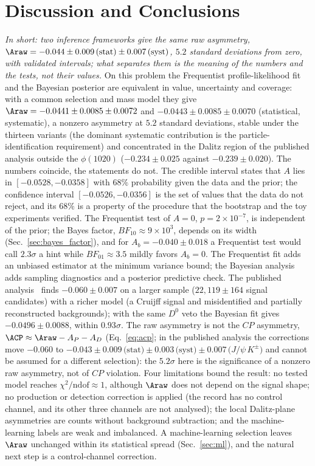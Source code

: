 \section{Discussion and Conclusions}
\label{sec:conclusions}
\label{app:conclusions}
\emph{In short: two inference frameworks give the same raw asymmetry, $\Araw=-0.044\pm0.009\,(\text{stat})\pm0.007\,(\text{syst})$, $5.2$ standard deviations from zero, with validated intervals; what separates them is the meaning of the numbers and the tests, not their values.}
On this problem the Frequentist profile-likelihood fit and the Bayesian posterior are equivalent in value, uncertainty and coverage: with a common selection and mass model they give $\Araw=-0.0441\pm0.0085\pm0.0072$ and $-0.0443\pm0.0085\pm0.0070$ (statistical, systematic), a nonzero asymmetry at $5.2$ standard deviations, stable under the thirteen variants (the dominant systematic contribution is the particle-identification requirement) and concentrated in the Dalitz region of the published analysis outside the $\phi(1020)$ ($-0.234\pm0.025$ against $-0.239\pm0.020$).
The numbers coincide, the statements do not. The credible interval states that $A$ lies in $[-0.0528,-0.0358]$ with $68\%$ probability given the data and the prior; the confidence interval $[-0.0526,-0.0356]$ is the set of values that the data do not reject, and its $68\%$ is a property of the procedure that the bootstrap and the toy experiments verified. The Frequentist test of $A=0$, $p=2\times10^{-7}$, is independent of the prior; the Bayes factor, $BF_{10}\approx9\times10^3$, depends on its width (Sec.~\ref{sec:bayes_factor}), and for $A_b=-0.040\pm0.018$ a Frequentist test would call $2.3\sigma$ a hint while $BF_{01}\approx3.5$ mildly favors $A_b=0$. The Frequentist fit adds an unbiased estimator at the minimum variance bound; the Bayesian analysis adds sampling diagnostics and a posterior predictive check.
The published analysis~\cite{lhcb_cpv_2013} finds $-0.060\pm0.007$ on a larger sample ($22{,}119\pm164$ signal candidates) with a richer model (a Cruijff signal and misidentified and partially reconstructed backgrounds); with the same $D^0$ veto the Bayesian fit gives $-0.0496\pm0.0088$, within $0.93\sigma$. The raw asymmetry is not the $CP$ asymmetry, $\ACP\approx\Araw-A_P-A_D$ (Eq.~\eqref{eq:acp}; in the published analysis the corrections move $-0.060$ to $-0.043\pm0.009 \,\text{(stat)}\pm0.003\,\text{(syst)}\pm0.007\,\text{($J/\psi\, K^{\pm}$)}$ and cannot be assumed for a different selection): the $5.2\sigma$ here is the significance of a nonzero raw asymmetry, not of $CP$ violation. Four limitations bound the result: no tested model reaches $\chi^2/\mathrm{ndof}\approx1$, although $\Araw$ does not depend on the signal shape; no production or detection correction is applied (the record has no control channel, and its other three channels are not analysed); the local Dalitz-plane asymmetries are counts without background subtraction; and the machine-learning labels are weak and imbalanced. A machine-learning selection leaves $\Araw$ unchanged within its statistical spread (Sec.~\ref{sec:ml}), and the natural next step is a control-channel correction.
